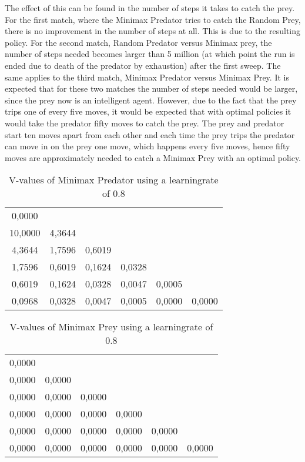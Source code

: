 The effect of this can be found in the number of steps it takes to catch the prey. For the first match, where the Minimax Predator tries to catch the Random Prey, there is no improvement in the number of steps at all. This is due to the resulting policy. For the second match, Random Predator versus Minimax prey, the number of steps needed becomes larger than 5 million (at which point the run is ended due to death of the predator by exhaustion) after the first sweep. The same applies to the third match, Minimax Predator versus Minimax Prey. It is expected that for these two matches the number of steps needed would be larger, since the prey now is an intelligent agent. However, due to the fact that the prey trips one of every five moves, it would be expected that with optimal policies it would take the predator fifty moves to catch the prey. The prey and predator start ten moves apart from each other and each time the prey trips the predator can move in on the prey one move, which happens every five moves, hence fifty moves are approximately needed to catch a Minimax Prey with an optimal policy.  


\begin{table}[htb]
\centering
\begin{tabular}{cccccc}
0,0000 &  &  &  &  & \\
10,0000 & 4,3644 &  &  &  & \\ 
4,3644 & 1,7596 & 0,6019 &  &  & \\
1,7596 & 0,6019 & 0,1624 & 0,0328 &  & \\ 
0,6019 & 0,1624 & 0,0328 & 0,0047 & 0,0005 & \\ 
0,0968 & 0,0328 & 0,0047 & 0,0005 & 0,0000 & 0,0000\\ 
\end{tabular}
\caption{V-values of Minimax Predator using a learningrate of 0.8}
\label{tab:predM}
\end{table}

\begin{table}[htb]
\centering
\begin{tabular}{cccccc}
0,0000 &  &  &  &  & \\ 
0,0000 & 0,0000 &  &  &  & \\ 
0,0000 & 0,0000 & 0,0000 &  &  & \\ 
0,0000 & 0,0000 & 0,0000 & 0,0000 &  & \\ 
0,0000 & 0,0000 & 0,0000 & 0,0000 & 0,0000 & \\ 
0,0000 & 0,0000 & 0,0000 & 0,0000 & 0,0000 & 0,0000\\ 
\end{tabular}
\caption{V-values of Minimax Prey using a learningrate of 0.8}
\label{tab:preyM}
\end{table}

\FloatBarrier